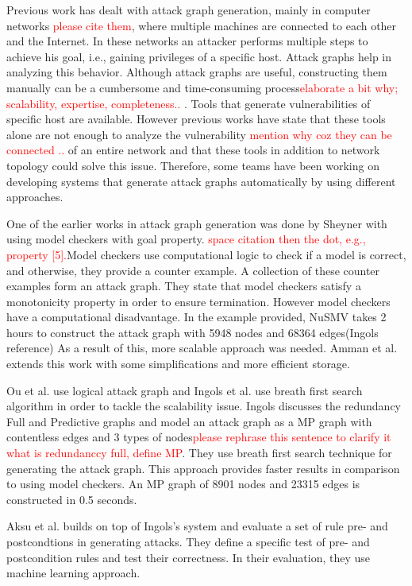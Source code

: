 \documentclass[letterpaper, 10 pt, conference]{ieeeconf}  %
\newcommand\todo[1]{\textcolor{red}{#1}}                                     %
\begin{document}
Previous work has dealt with attack graph generation, mainly in computer networks \todo{please cite them}, where multiple machines are connected to each other and the Internet. In these networks an attacker performs multiple steps to achieve his goal, i.e., gaining privileges of a specific host. Attack graphs help in analyzing this behavior. Although attack graphs are useful, constructing them manually can be a cumbersome and time-consuming process\todo{elaborate a bit why; scalability, expertise, completeness.. }. Tools that generate vulnerabilities of specific host are available. However previous works have state that these tools alone are not enough to analyze the vulnerability \todo{mention why coz they can be connected ..} of an entire network and that these tools in addition to network topology could solve this issue. Therefore, some teams have been  working on developing systems that generate attack graphs automatically by using different approaches.

One of the earlier works in attack graph generation was done by Sheyner with using model checkers with goal property.\cite{ingols} \todo{space citation then the dot, e.g., property [5].}Model checkers use computational logic to check if a model is correct, and otherwise, they provide a counter example. A collection of these counter examples form an attack graph. They state that model checkers satisfy a monotonicity property in order to ensure termination. However model checkers have a computational disadvantage. In the example provided, NuSMV takes 2 hours to construct the attack graph with 5948 nodes and 68364 edges(Ingols reference) As a result of this, more scalable approach was needed. Amman et al. extends this work with some simplifications and more efficient storage.\cite{amman}

Ou et al. use logical attack graph\cite{ou} and Ingols\cite{ingols} et al. use breath first search algorithm in order to tackle the scalability issue. Ingols discusses the redundancy Full and Predictive graphs and model an attack graph as a MP graph with contentless edges and 3 types of nodes\todo{please rephrase this sentence to clarify it what is redundanccy full, define MP}. They use breath first search technique for generating the attack graph. This approach provides faster results in comparison to using model checkers. An MP graph of 8901 nodes and 23315 edges is constructed in 0.5 seconds.

Aksu et al. builds on top of Ingols's system and evaluate a set of rule pre- and postcondtions in generating attacks.\cite{aksu} They define a specific test of pre- and postcondition rules and test their correctness. In their evaluation, they use machine learning approach.
\end{document}
